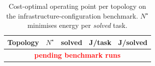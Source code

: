 \begin{table}[t]
\ROOF{}
\caption{Cost-optimal operating point per topology on the infrastructure-configuration
benchmark. $N^\star$ minimises energy per \emph{solved} task.}
\label{tab:infra}
\centering
\small
\begin{tabular}{@{}lrrrr@{}}
\toprule
Topology & $N^\star$ & solved & J/task & J/solved \\
\midrule
\multicolumn{5}{c}{\textcolor{red}{\textbf{pending benchmark runs}}} \\
\bottomrule
\end{tabular}
\end{table}
